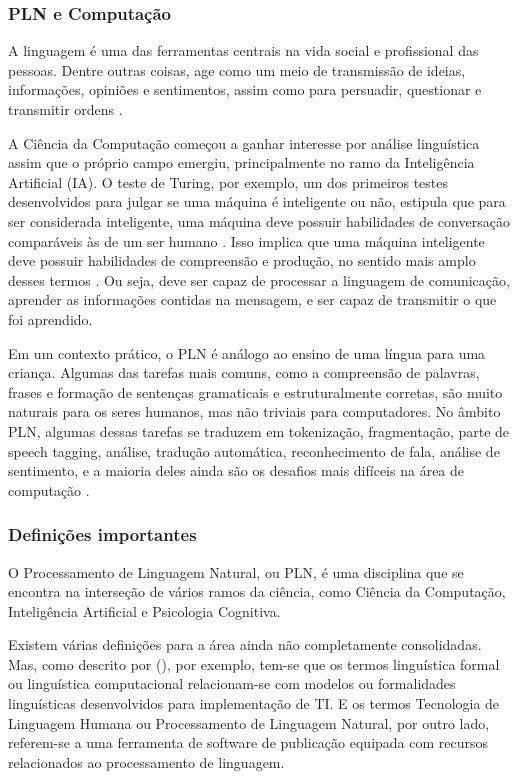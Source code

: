 \documentclass[
	12pt,				%
	openright,			%
	oneside,			%
	a4paper,			%
	english,			%
	spanish,			%
	brazil				%
	]{abntex2}
\begin{document}
		\subsubsection*{PLN e Computação}
		A linguagem é uma das ferramentas centrais na vida social e profissional das pessoas. Dentre outras coisas, age como um meio de transmissão de ideias, informações, opiniões e sentimentos, assim como para persuadir, questionar e transmitir ordens \cite{book_natural_lang}.
		
	A Ciência da Computação começou a ganhar interesse por análise linguística assim que o próprio campo emergiu, principalmente no ramo da Inteligência Artificial (IA). O teste de Turing, por exemplo, um dos primeiros testes desenvolvidos para julgar se uma máquina é inteligente ou não, estipula que para ser considerada inteligente, uma máquina deve possuir habilidades de conversação comparáveis às de um ser humano \cite{turing}. Isso implica que uma máquina inteligente deve possuir habilidades de compreensão e produção, no sentido mais amplo desses termos \cite{book_natural_lang}. Ou seja, deve ser capaz de processar a linguagem de comunicação, aprender as informações contidas na mensagem, e ser capaz de transmitir o que foi aprendido. 	
	
	Em um contexto prático, o PLN é análogo ao ensino de uma língua para uma criança. Algumas das tarefas mais comuns, como a compreensão de palavras, frases e formação de sentenças gramaticais e estruturalmente corretas, são muito naturais para os seres humanos, mas não triviais para computadores. No âmbito PLN, algumas dessas tarefas se traduzem em tokenização, fragmentação, parte de speech tagging, análise, tradução automática, reconhecimento de fala, análise de sentimento, e a maioria deles ainda são os desafios mais difíceis na área de computação \cite{book_natlang_python}.
		
	\subsubsection*{Definições importantes}
	O Processamento de Linguagem Natural, ou PLN, é uma disciplina que se encontra na interseção de vários ramos da ciência, como Ciência da Computação, Inteligência Artificial e Psicologia Cognitiva. 
	
Existem várias definições para a área ainda não completamente consolidadas. Mas, como descrito por   (\citeyear{book_natural_lang}), por exemplo, tem-se que os termos linguística formal ou linguística computacional relacionam-se com modelos ou formalidades linguísticas desenvolvidos para implementação de TI. E os termos Tecnologia de Linguagem Humana ou Processamento de Linguagem Natural, por outro lado, referem-se a uma ferramenta de software de publicação equipada com recursos relacionados ao processamento de linguagem. 
\end{document}
